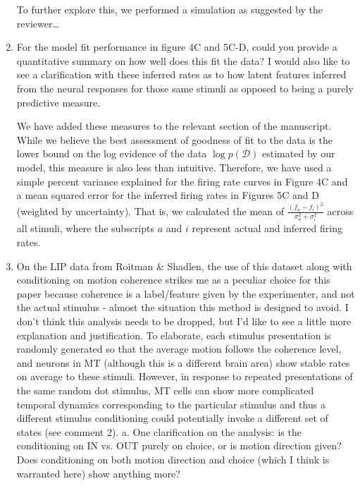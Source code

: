 \documentclass[12pt,a4paper]{article}
\newcommand{\edit}[1]{\textcolor{edit}{#1}}
\begin{document}
\begin{enumerate}
{\color{red}
To further explore this, we performed a simulation as suggested by the reviewer\ldots
}

\item For the model fit performance in figure 4C and 5C-D, could you provide a quantitative summary on how well does this fit the data? I would also like to see a clarification with these inferred rates as to how latent features inferred from the neural responses for those same stimuli as opposed to being a purely predictive measure.

\edit{
We have added these measures to the relevant section of the manuscript. While we believe the best assessment of goodness of fit to the data is the lower bound on the log evidence of the data $\log p(\mathcal{D})$ estimated by our model, this measure is also less than intuitive.
{\color{red} Therefore, we have used a simple percent variance explained for the firing rate curves in Figure 4C and a mean squared error for the inferred firing rates in Figures 5C and D (weighted by uncertainty). That is, we calculated the mean of $\frac{(f_a - f_i)^2}{\sigma_a^2 + \sigma_i^2}$ across all stimuli, where the subscripts $a$ and $i$ represent actual and inferred firing rates.}
}

\item On the LIP data from Roitman \& Shadlen, the use of this dataset along with conditioning on motion coherence strikes me as a peculiar choice for this paper because coherence is a label/feature given by the experimenter, and not the actual stimulus - almost the situation this method is designed to avoid. I don’t think this analysis needs to be dropped, but I’d like to see a little more explanation and justification. To elaborate, each stimulus presentation is randomly generated so that the average motion follows the coherence level, and neurons in MT (although this is a different brain area) show stable rates on average to these stimuli. However, in response to repeated presentations of the same random dot stimulus, MT cells can show more complicated temporal dynamics corresponding to the particular stimulus and thus a different stimulus conditioning could potentially invoke a different set of states (see comment 2).
a. One clarification on the analysis: is the conditioning on IN vs. OUT purely on choice, or is motion direction given? Does conditioning on both motion direction and choice (which I think is warranted here) show anything more?


\end{enumerate}
\end{document}
